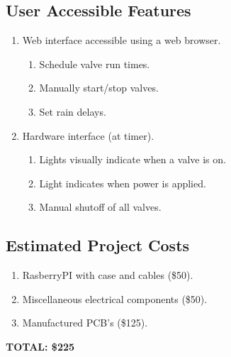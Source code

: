 \documentclass[12pt,letterpaper]{article}
\begin{document}
\begin{samepage}
\section{User Accessible Features}

\begin{enumerate}
\item Web interface accessible using a web browser.
	\begin{enumerate}
	\item Schedule valve run times.
	\item Manually start/stop valves.
	\item Set rain delays.
	\end{enumerate}
\item Hardware interface (at timer).
	\begin{enumerate}
	\item Lights visually indicate when a valve is on.
	\item Light indicates when power is applied.
	\item Manual shutoff of all valves.
	\end{enumerate}
\end{enumerate}
\end{samepage}


\begin{samepage}
\section{Estimated Project Costs}

\begin{enumerate}
\item RasberryPI\autocite{rpi} with case and cables (\$50).
\item Miscellaneous electrical components (\$50).
\item Manufactured PCB's (\$125).
\end{enumerate}

\textbf{TOTAL: \$225}
\end{samepage}

\pagebreak
\printbibliography[heading=bibintoc]
\end{document}
